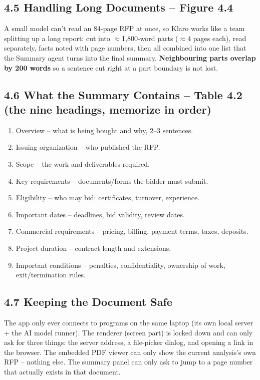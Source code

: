 \documentclass[11pt,a4paper]{article}
\begin{document}
\subsection*{4.5 Handling Long Documents -- Figure 4.4}
A small model can't read an 84-page RFP at once, so Klaro works like a team splitting up a long
report: cut into $\approx$1{,}800-word parts ($\approx$4 pages each), read separately, facts noted
with page numbers, then all combined into one list that the Summary agent turns into the final
summary. \textbf{Neighbouring parts overlap by 200 words} so a sentence cut right at a part boundary
is not lost.

\subsection*{4.6 What the Summary Contains -- Table 4.2 (the nine headings, memorize in order)}
\begin{enumerate}[leftmargin=1.4cm]
  \item Overview -- what is being bought and why, 2--3 sentences.
  \item Issuing organization -- who published the RFP.
  \item Scope -- the work and deliverables required.
  \item Key requirements -- documents/forms the bidder must submit.
  \item Eligibility -- who may bid: certificates, turnover, experience.
  \item Important dates -- deadlines, bid validity, review dates.
  \item Commercial requirements -- pricing, billing, payment terms, taxes, deposits.
  \item Project duration -- contract length and extensions.
  \item Important conditions -- penalties, confidentiality, ownership of work, exit/termination rules.
\end{enumerate}

\subsection*{4.7 Keeping the Document Safe}
The app only ever connects to programs on the same laptop (its own local server + the AI model
runner). The renderer (screen part) is locked down and can only ask for three things: the server
address, a file-picker dialog, and opening a link in the browser. The embedded PDF viewer can only
show the current analysis's own RFP -- nothing else. The summary panel can only ask to jump to a page
number that actually exists in that document.
\end{document}
